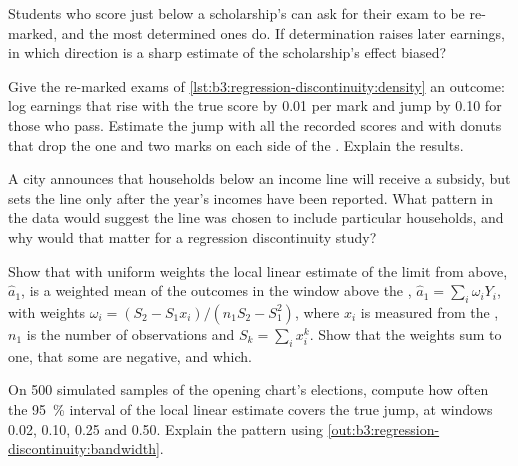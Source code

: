 \begin{exercise}[$\star\star$]\label{exo:b3:regression-discontinuity:7}
Students who score just below a scholarship's  can ask for their exam to
be re-marked, and the most determined ones do. If determination raises later
earnings, in which direction is a sharp estimate of the scholarship's effect
biased?
\end{exercise}

\begin{exercise}[$\star\star$]\label{exo:b3:regression-discontinuity:8}
Give the re-marked exams of \cref{lst:b3:regression-discontinuity:density} an
outcome: log earnings that rise with the true score by 0.01 per mark and jump by
0.10 for those who pass. Estimate the jump with all the recorded scores and with
donuts that drop the one and two marks on each side of the . Explain the
results.
\end{exercise}

\begin{exercise}[$\star\star$]\label{exo:b3:regression-discontinuity:9}
A city announces that households below an income line will receive a subsidy,
but sets the line only after the year's incomes have been reported. What pattern
in the data would suggest the line was chosen to include particular
households, and why would that matter for a regression discontinuity study?
\end{exercise}

\begin{exercise}[$\star\star\star$]\label{exo:b3:regression-discontinuity:10}
Show that with uniform weights the local linear estimate of the limit from
above, $\hat a_1$, is a weighted mean of the outcomes in the window above the
, $\hat a_1 = \sum_i \omega_i Y_i$, with weights $\omega_i = (S_2 - S_1
x_i)/(n_1 S_2 - S_1^2)$, where $x_i$ is measured from the , $n_1$ is the
number of observations and $S_k = \sum_i x_i^k$. Show that the weights sum to
one, that some are negative, and which.
\end{exercise}

\begin{exercise}[$\star\star\star$]\label{exo:b3:regression-discontinuity:11}
On 500 simulated samples of the opening chart's elections, compute how often the
95~\% interval of the local linear estimate covers the true jump, at windows
0.02, 0.10, 0.25 and 0.50. Explain the pattern using \cref{out:b3:regression-discontinuity:bandwidth}.
\end{exercise}

